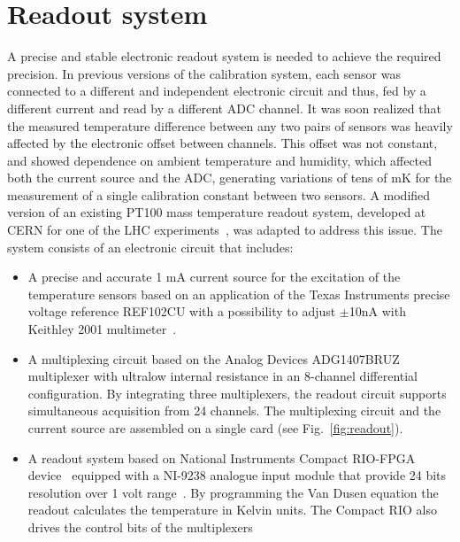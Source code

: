 \section{Readout system}
\label{sec:readout}
\noindent A precise and stable electronic readout system is needed to achieve the required precision. In previous versions of the calibration system, each sensor was connected to a different and independent electronic circuit and thus, fed by a different current and read by a different ADC channel. It was soon realized that the measured temperature difference between any two pairs of sensors was heavily affected by the electronic offset between channels. This offset was not constant, and showed dependence on ambient temperature and humidity, which affected both the current source and the ADC, generating variations of tens of mK for the measurement of a single calibration constant between two sensors. A modified version of an existing PT100 mass temperature readout system, developed at CERN for one of the LHC experiments~\cite{bib:multiplexing_board}, was adapted to address this issue. The system consists of an electronic circuit that includes:

\begin{itemize}
\item A precise and accurate 1 mA current source for the excitation of the temperature sensors based on an application of the Texas Instruments precise voltage reference REF102CU with a possibility to adjust $\pm$10nA with Keithley 2001 multimeter~\cite{xavier,keithley}.%
\item A multiplexing circuit based on the Analog Devices ADG1407BRUZ multiplexer with ultralow internal resistance in an 8-channel differential configuration. By integrating three multiplexers, the readout circuit supports simultaneous acquisition from 24 channels. The multiplexing circuit and the current source are assembled on a single card (see Fig.~\ref{fig:readout}).
\item A readout system based on National Instruments Compact RIO-FPGA device~\cite{compactrio} equipped with a NI-9238 analogue input module that provide 24 bits resolution over 1 volt range~\cite{ni9238}. By programming the Van Dusen equation the readout calculates the temperature in Kelvin units. The Compact RIO also drives the control bits of the multiplexers
\end{itemize}

